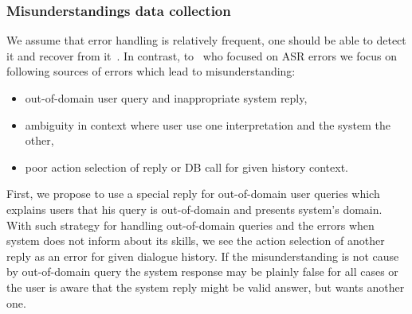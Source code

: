 \documentclass[11pt]{article}
\begin{document}
\subsubsection*{Misunderstandings data collection}
We assume that error handling is relatively frequent, one should be able to detect it and recover from it~\cite{skantze_error_2007}.
In contrast, to~\cite{skantze_error_2007} who focused on ASR errors we focus on following sources of errors which lead to misunderstanding:
\begin{itemize}
    \item out-of-domain user query and inappropriate system reply,
    \item ambiguity in context where user use one interpretation and the system the other,
    \item poor action selection of reply or DB call for given history context.
\end{itemize}
First, we propose to use a special reply for out-of-domain user queries which explains users that his query is out-of-domain and presents system's domain.~\cite{platek_self_2015}
With such strategy for handling out-of-domain queries and the errors when system does not inform about its skills, we see the action selection of another reply as an error for given dialogue history.
If the misunderstanding is not cause by out-of-domain query the system response may be plainly false for all cases or the user is aware that the system reply might be valid answer, but wants another one.
%
\end{document}
